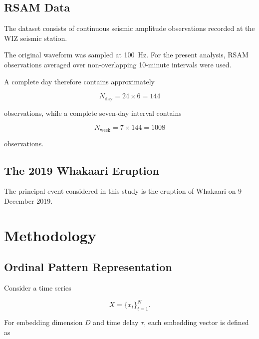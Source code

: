 \documentclass[journal]{IEEEtran}
\begin{document}
	\subsection{RSAM Data}
	
	The dataset consists of continuous seismic amplitude observations
	recorded at the WIZ seismic station.
	
	The original waveform was sampled at \SI{100}{Hz}. For the present
	analysis, RSAM observations averaged over non-overlapping
	10-minute intervals were used.
	
	A complete day therefore contains approximately
	
	\begin{equation}
		N_{\mathrm{day}} = 24 \times 6 = 144
	\end{equation}
	
	observations, while a complete seven-day interval contains
	
	\begin{equation}
		N_{\mathrm{week}} = 7 \times 144 = 1008
	\end{equation}
	
	observations.
	
	
	\subsection{The 2019 Whakaari Eruption}
	
	The principal event considered in this study is the eruption of
	Whakaari on 9 December 2019.
	
	
	
	\section{Methodology}
	
	\subsection{Ordinal Pattern Representation}
	
	Consider a time series
	
	\begin{equation}
		X = \{x_t\}_{t=1}^{N}.
	\end{equation}
	
	For embedding dimension $D$ and time delay $\tau$, each
	embedding vector is defined as
	
\end{document}
